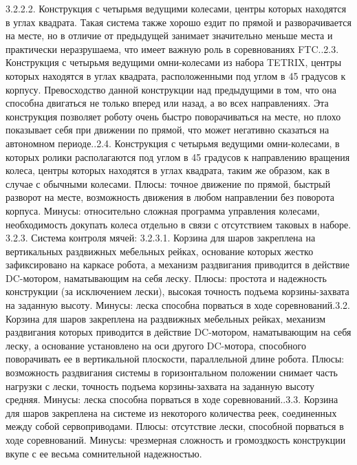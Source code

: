 \documentclass[12pt]{article}
\begin{document}
\begin{enumerate}
	      	3.2.2.2.	Конструкция с четырьмя ведущими колесами, центры которых находятся в углах квадрата. Такая система также хорошо ездит по прямой и разворачивается на месте, но в отличие от предыдущей занимает значительно меньше места и практически неразрушаема, что имеет важную роль в соревнованиях FTC..2.3.	Конструкция с четырьмя ведущими омни-колесами из набора TETRIX, центры которых находятся в углах квадрата, расположенными под углом в 45 градусов к корпусу. Превосходство данной конструкции над предыдущими в том, что она способна двигаться не только вперед или назад, а во всех направлениях. Эта конструкция позволяет роботу очень быстро поворачиваться на месте, но плохо показывает себя при движении по прямой, что может негативно сказаться на автономном периоде..2.4.	 Конструкция с четырьмя ведущими омни-колесами, в которых ролики располагаются под углом в 45 градусов к направлению вращения колеса, центры которых находятся в углах квадрата, таким же образом, как в случае с обычными колесами. Плюсы: точное движение по прямой, быстрый разворот на месте, возможность движения в любом направлении без поворота корпуса. Минусы: относительно сложная программа управления колесами, необходимость докупать колеса отдельно в связи с отсутствием таковых в наборе.
	      	3.2.3.	Система контроля мячей:
	      	3.2.3.1.	Корзина для шаров закреплена на вертикальных раздвижных мебельных рейках, основание которых жестко зафиксировано на каркасе робота, а механизм раздвигания приводится в действие DC-мотором, наматывающим на себя леску. Плюсы: простота и надежность конструкции (за исключением лески), высокая точность подъема корзины-захвата на заданную высоту. Минусы: леска способна порваться в ходе соревнований.3.2.	Корзина для шаров закреплена на раздвижных мебельных рейках, механизм раздвигания которых приводится в действие DC-мотором, наматывающим на себя леску, а основание установлено на оси другого DC-мотора, способного поворачивать ее в вертикальной плоскости, параллельной длине робота. Плюсы: возможность раздвигания системы в горизонтальном положении снимает часть нагрузки с лески, точность подъема корзины-захвата на заданную высоту средняя. Минусы: леска способна порваться в ходе соревнований..3.3.	Корзина для шаров закреплена на системе из некоторого количества реек, соединенных между собой сервоприводами. Плюсы: отсутствие лески, способной порваться в ходе соревнований. Минусы: чрезмерная сложность и громоздкость конструкции вкупе с ее весьма сомнительной надежностью.\newline

\end{enumerate}
\end{document}
